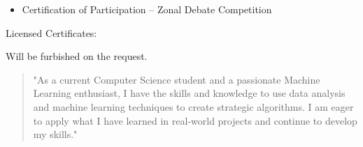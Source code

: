 \documentclass[10pt,a4paper,ragged2e,withhyper]{altacv}
\begin{document}
\begin{paracol}{2}
\begin{itemize}
\item      Certification of Participation – Zonal Debate Competition 
\end{itemize}
Licensed Certificates:

\divider

Will be furbished on the request.








\switchcolumn


\begin{quote}
"As a current Computer Science student and a passionate Machine Learning enthusiast, I have the skills and knowledge to use data analysis and machine learning techniques to create strategic algorithms. I am eager to apply what I have learned in real-world projects and continue to develop my skills."
\end{quote}








\end{paracol}
\end{document}
